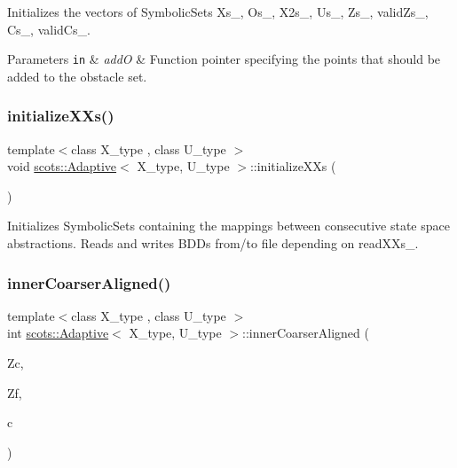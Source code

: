 Initializes the vectors of Symbolic\+Sets Xs\+\_\+, Os\+\_\+, X2s\+\_\+, Us\+\_\+, Zs\+\_\+, valid\+Zs\+\_\+, Cs\+\_\+, valid\+Cs\+\_\+. 
\begin{DoxyParams}[1]{Parameters}
\mbox{\tt in}  & {\em addO} & Function pointer specifying the points that should be added to the obstacle set. \\
\hline
\end{DoxyParams}
\mbox{\label{classscots_1_1Adaptive_af08ee7fae4cf6c5ae1fcabb8699e0721}} 
\subsubsection{\texorpdfstring{initialize\+X\+Xs()}{initializeXXs()}}
{\footnotesize\ttfamily template$<$class X\+\_\+type , class U\+\_\+type $>$ \\
void \hyperlink{classscots_1_1Adaptive}{scots\+::\+Adaptive}$<$ X\+\_\+type, U\+\_\+type $>$\+::initialize\+X\+Xs (\begin{DoxyParamCaption}{ }\end{DoxyParamCaption})\hspace{0.3cm}{\ttfamily [inline]}}

Initializes Symbolic\+Sets containing the mappings between consecutive state space abstractions. Reads and writes B\+D\+Ds from/to file depending on read\+X\+Xs\+\_\+. \mbox{\label{classscots_1_1Adaptive_a01f8f69d290f9c81f76f6ab44d9ef193}} 
\subsubsection{\texorpdfstring{inner\+Coarser\+Aligned()}{innerCoarserAligned()}}
{\footnotesize\ttfamily template$<$class X\+\_\+type , class U\+\_\+type $>$ \\
int \hyperlink{classscots_1_1Adaptive}{scots\+::\+Adaptive}$<$ X\+\_\+type, U\+\_\+type $>$\+::inner\+Coarser\+Aligned (\begin{DoxyParamCaption}\item[{Symbolic\+Set $\ast$}]{Zc,  }\item[{Symbolic\+Set $\ast$}]{Zf,  }\item[{int}]{c }\end{DoxyParamCaption})\hspace{0.3cm}{\ttfamily [inline]}}

